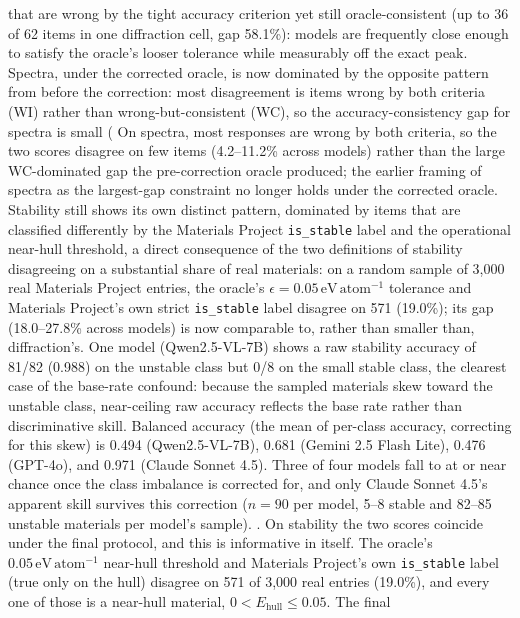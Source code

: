 \documentclass[pdflatex,sn-nature]{sn-jnl}
\newcommand{\rev}[1]{#1} %
\newcommand{\rev}[1]{{\color{blue}#1}} %
\providecommand{\DIFadd}[1]{{\protect\color{blue} \sf #1}} %
\providecommand{\DIFdel}[1]{{\protect\color{red} \scriptsize #1}} %
\providecommand{\DIFaddbegin}{} %
\providecommand{\DIFaddend}{} %
\providecommand{\DIFdelbegin}{} %
\providecommand{\DIFdelend}{} %
\providecommand{\DIFscaledelfig}{0.5}
\newlength{\DIFdelgraphicswidth} %
\newlength{\DIFdelgraphicsheight} %
\providecommand{\DIFaddincludegraphics}[2][]{{\color{blue}\fbox{\DIFOincludegraphics[#1]{#2}}}} %
\providecommand{\DIFdelincludegraphics}[2][]{%
\sbox{\DIFdelgraphicsbox}{\DIFOincludegraphics[#1]{#2}}%
\settoboxwidth{\DIFdelgraphicswidth}{\DIFdelgraphicsbox} %
\settoboxtotalheight{\DIFdelgraphicsheight}{\DIFdelgraphicsbox} %
\scalebox{\DIFscaledelfig}{%
\parbox[b]{\DIFdelgraphicswidth}{\usebox{\DIFdelgraphicsbox}\\[-\baselineskip] \rule{\DIFdelgraphicswidth}{0em}}\llap{\resizebox{\DIFdelgraphicswidth}{\DIFdelgraphicsheight}{%
\setlength{\unitlength}{\DIFdelgraphicswidth}%
\begin{picture}(1,1)%
\thicklines\linethickness{2pt} %
{\color[rgb]{1,0,0}\put(0,0){\framebox(1,1){}}}%
{\color[rgb]{1,0,0}\put(0,0){\line( 1,1){1}}}%
{\color[rgb]{1,0,0}\put(0,1){\line(1,-1){1}}}%
\end{picture}%
}\hspace*{3pt}}} %
} %
\DeclareRobustCommand{\DIFaddbegin}{\DIFOaddbegin \let\includegraphics\DIFaddincludegraphics} %
\DeclareRobustCommand{\DIFaddend}{\DIFOaddend \let\includegraphics\DIFOincludegraphics} %
\DeclareRobustCommand{\DIFdelbegin}{\DIFOdelbegin \let\includegraphics\DIFdelincludegraphics} %
\DeclareRobustCommand{\DIFdelend}{\DIFOaddend \let\includegraphics\DIFOincludegraphics} %
\begin{document}
that are wrong by the tight accuracy criterion yet still oracle-consistent (up to 36
of 62 items in one diffraction cell, gap 58.1\%): models are frequently close enough to satisfy the
oracle's looser tolerance while measurably off the exact peak. \DIFdelbegin \DIFdel{Spectra, under the corrected
oracle, is now dominated by the opposite pattern from before the correction: most
disagreement is items wrong by both criteria (WI) rather than wrong-but-consistent (WC),
so the accuracy-consistency gap for spectra is small (}\DIFdelend \DIFaddbegin \DIFadd{\rev{On spectra, most responses
are wrong by both criteria, so the two scores disagree on few items} (}\DIFaddend 4.2--11.2\% across models)\DIFdelbegin \DIFdel{rather
than the large WC-dominated gap the pre-correction oracle produced; the earlier framing of
spectra as the largest-gap constraint no longer holds under the corrected oracle. Stability
still shows its own distinct pattern, dominated by items that are classified differently by the Materials Project \texttt{is\_stable} label
and the operational near-hull threshold, a direct
consequence of the two definitions of stability disagreeing on a substantial share of real
materials: on a random sample of 3,000 real Materials Project entries, the oracle's
$\epsilon=0.05\,\mathrm{eV\,atom^{-1}}$ tolerance and Materials Project's own strict
\texttt{is\_stable} label disagree on 571 (19.0\%); its gap (18.0--27.8\% across models) is now
comparable to, rather than smaller than, diffraction's. One model (Qwen2.5-VL-7B) shows a raw stability accuracy
of 81/82 (0.988) on the unstable class but 0/8 on the small stable class, the clearest case of the base-rate confound: because the sampled materials skew
toward the unstable class, near-ceiling raw accuracy reflects the base rate rather than
discriminative skill. Balanced accuracy (the mean of per-class accuracy, correcting for
this skew) is 0.494 (Qwen2.5-VL-7B), 0.681 (Gemini 2.5 Flash Lite), 0.476 (GPT-4o), and
0.971 (Claude Sonnet 4.5). Three of four models fall to at or near chance once the
class imbalance is corrected for, and only Claude Sonnet 4.5's apparent skill survives
this correction ($n=90$ per model, 5--8 stable and 82--85 unstable materials per model's
sample).
}\DIFdelend \DIFaddbegin \DIFadd{. \rev{On stability the two scores coincide under the final protocol,
and this is informative in itself. The oracle's $0.05\,\mathrm{eV\,atom^{-1}}$ near-hull threshold and
Materials Project's own \texttt{is\_stable} label (true only on the hull) disagree on 571 of 3,000 real
entries (19.0\%), and every one of those is a near-hull material, $0<E_{\mathrm{hull}}\le0.05$. The final
}}
\end{document}
